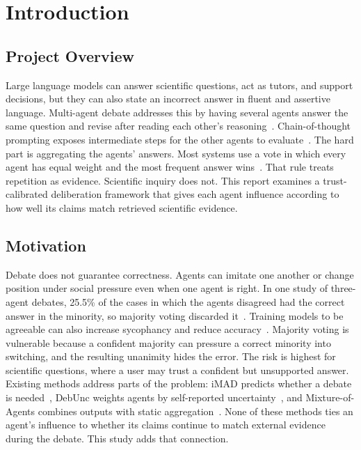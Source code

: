 \chapter{Introduction}\label{chapter:introduction}

\section{Project Overview}\label{sec:project-overview}

Large language models can answer scientific questions, act as tutors, and support decisions, but they can also state an incorrect answer in fluent and assertive language. Multi-agent debate addresses this by having several agents answer the same question and revise after reading each other's reasoning~\cite{du2024improving}. Chain-of-thought prompting exposes intermediate steps for the other agents to evaluate~\cite{wei2022chain}. The hard part is aggregating the agents' answers. Most systems use a vote in which every agent has equal weight and the most frequent answer wins~\cite{wang-etal-2024-rethinking-bounds,choi2025debate}. That rule treats repetition as evidence. Scientific inquiry does not. This report examines a trust-calibrated deliberation framework that gives each agent influence according to how well its claims match retrieved scientific evidence.

\section{Motivation}\label{sec:motivation}

Debate does not guarantee correctness. Agents can imitate one another or change position under social pressure even when one agent is right. In one study of three-agent debates, 25.5\% of the cases in which the agents disagreed had the correct answer in the minority, so majority voting discarded it~\cite{he2026minority}. Training models to be agreeable can also increase sycophancy and reduce accuracy~\cite{ibrahim2026training}. Majority voting is vulnerable because a confident majority can pressure a correct minority into switching, and the resulting unanimity hides the error. The risk is highest for scientific questions, where a user may trust a confident but unsupported answer. Existing methods address parts of the problem: iMAD predicts whether a debate is needed~\cite{fan2026imad}, DebUnc weights agents by self-reported uncertainty~\cite{yoffe-etal-2025-debunc}, and Mixture-of-Agents combines outputs with static aggregation~\cite{wang2025mixture}. None of these methods ties an agent's influence to whether its claims continue to match external evidence during the debate. This study adds that connection.


